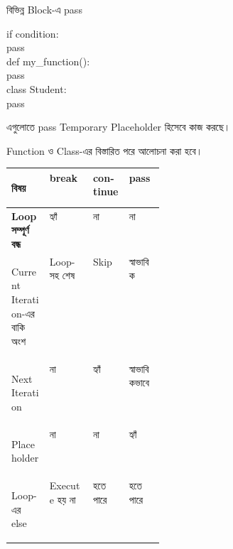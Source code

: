 \begin{codeoutputbox}{বিভিন্ন Block-এ \textenglish{\ttfamily pass}}

\noindent
\begin{minipage}[t]{0.58\linewidth}
\codeheading

\begin{english}
\ttfamily
if condition:\\
\hspace*{4mm}pass\\[1mm]
def my\_function():\\
\hspace*{4mm}pass\\[1mm]
class Student:\\
\hspace*{4mm}pass
\end{english}

\end{minipage}
\hfill
\begin{minipage}[t]{0.38\linewidth}
\outputheading

এগুলোতে
\textenglish{\ttfamily pass}
Temporary Placeholder হিসেবে কাজ করছে।

\medskip

Function ও Class-এর বিস্তারিত পরে আলোচনা করা হবে।

\end{minipage}

\end{codeoutputbox}



\begin{tabularx}
{\linewidth}
{
|>{\bfseries\RaggedRight\arraybackslash}p{0.25\linewidth}
|>{\centering\arraybackslash}Y
|>{\centering\arraybackslash}Y
|>{\centering\arraybackslash}Y|
}

\hline
{}

\textbf{বিষয়}
&
\textenglish{\ttfamily break}
&
\textenglish{\ttfamily continue}
&
\textenglish{\ttfamily pass}
\\
\hline

Loop সম্পূর্ণ বন্ধ
&
হ্যাঁ
&
না
&
না
\\
\hline

Current Iteration-এর বাকি অংশ
&
Loop-সহ শেষ
&
Skip
&
স্বাভাবিক
\\
\hline

Next Iteration
&
না
&
হ্যাঁ
&
স্বাভাবিকভাবে
\\
\hline

Placeholder
&
না
&
না
&
হ্যাঁ
\\
\hline

Loop-এর \textenglish{\ttfamily else}
&
Execute হয় না
&
হতে পারে
&
হতে পারে
\\
\hline

\end{tabularx}

